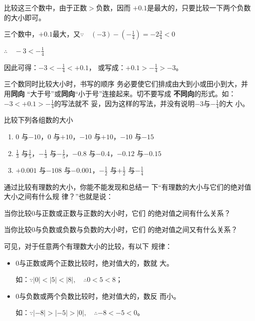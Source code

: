\begin{analyze}
比较这三个数中，由于正数$>$负数，因而
$+0.1$是最大的，只要比较一下两个负数的大小即可。
\end{analyze}

\begin{solution}
    三个数中，$+0.1$最大，又$\because\quad (-3)-\left(-\frac{1}{4}\right)=-2\frac{3}{4}<0$

    $\therefore\quad -3<-\frac{1}{4}$

    因此可得：$-3<-\frac{1}{4}<+0.1$，
    或写成：$+0.1>-\frac{1}{4}>-3$。
\end{solution}

\begin{rmk}
三个数同时比较大小时，书写的顺序
务必要使它们排成由大到小或田小到大，并用\textbf{同向}
“大于号”或\textbf{同向}“小于号”连接起来。切不要写成
\textbf{不同向}的形式。如：$-3<+0.1>-\frac{1}{4}$的写法就不
妥，因为这样的写法，并没有说明$-3$与$-\frac{1}{4}$的大
小。
\end{rmk}

\begin{ex}
    比较下列各组数的大小
\begin{enumerate}
    \item $0$ 与$-10$，\quad $0$ 与$+10$，\quad $-10$ 与$+10$，\quad $-10$ 与$-15$
    \item $\frac{1}{3}$ 与$\frac{1}{5}$，\quad $-\frac{1}{3}$ 与$-\frac{1}{5}$，\quad $-0.8$ 与$-0.4$，\quad $-0.12$ 与$-0.15$
    \item $+0.001$ 与$-108$ 与$-0.001$，\quad $-\frac{1}{2}$ 与$+\frac{1}{2}$ 与$-\frac{1}{4}$
\end{enumerate}
\end{ex}

通过比较有理数的大小，你能不能发现和总结一
下“有理数的大小与它们的绝对值大小之间有什么规
律？”也就是说：

    当你比较0与正数或正数与正数的大小时，它们
的绝对值之间有什么关系？

    当你比较0与负数或负数与负数的大小时，它们
的绝对值之间又有什么关系？

    可见，对于任意两个有理数大小的比较，有以下
规律：
\begin{itemize}
    \item 0与正数或两个正数比较时，绝对值大的，数就
大。

如：$\because |0|<|5|<|8|, \quad \therefore 0<5<8$；
\item 0与负数或两个负数比较时，绝对值大的，数反
而小。

如：$\because |-8|>|-5|>|0|, \quad \therefore -8<-5<0$。
\end{itemize}
    
